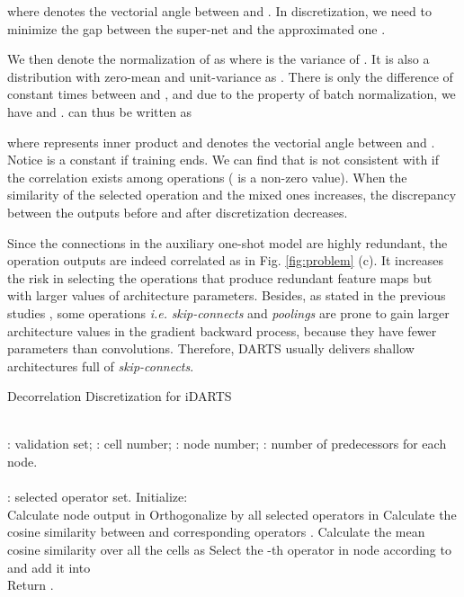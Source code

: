 \documentclass[journal]{IEEEtran}
\begin{document}
where  denotes the vectorial angle between  and . In discretization, we need to minimize the gap between the super-net  and the approximated one .

We then denote the normalization of  as  where  is the variance of . It is also a distribution with zero-mean and unit-variance as . There is only the difference of constant times between  and , and due to the property of batch normalization, we have  and .  can thus be written as 



where  represents inner product and  denotes the vectorial angle between  and . Notice  is a constant if training ends. We can find that  is not consistent with  if the correlation exists among operations ( is a non-zero value). 
When the similarity of the selected operation and the mixed ones increases, the discrepancy between the outputs before and after discretization decreases. 

Since the connections in the auxiliary one-shot model are highly redundant, the operation outputs are indeed correlated as in Fig. \ref{fig:problem} (c). It increases the risk in selecting the operations that produce redundant feature maps but with larger values of architecture parameters. Besides, as stated in the previous studies \cite{DBLP:journals/corr/abs-1904-12760}, some operations \emph{i.e.} \textit{skip-connects} and \textit{poolings} are prone to gain larger architecture values in the gradient backward process, because they have fewer parameters than convolutions. Therefore, DARTS usually delivers shallow architectures full of \textit{skip-connects}.




\begin{algorithm}[htb]
\caption{Decorrelation Discretization for iDARTS}
\label{Alg:1}
\begin{algorithmic}[1]
\REQUIRE ~~\\
: validation set; : cell number; : node number; : number of predecessors for each node. \\
\ENSURE ~~\\
: selected operator set.
\STATE Initialize: \\
{
{
\STATE Calculate node output  in 
\STATE Orthogonalize   by all selected operators in 
\STATE Calculate the cosine similarity  between   and corresponding operators .
\ENDFOR
}
\ENDFOR
}
\STATE Calculate the mean cosine similarity over all the cells as 
\STATE Select the -th operator in node  according to  and add it into 
\ENDFOR\\
\STATE Return .

\end{algorithmic}
\end{algorithm}
\end{document}
